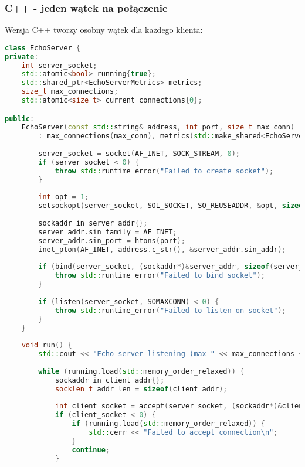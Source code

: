 \subsubsection{C++ - jeden wątek na połączenie}
Wersja C++ tworzy osobny wątek dla każdego klienta:
\begin{lstlisting}[language=C++, caption={Echo Serwer w C++ z jednym wątkiem na połączenie}, label={lst:cpp_echo_server}]
class EchoServer {
private:
    int server_socket;
    std::atomic<bool> running{true};
    std::shared_ptr<EchoServerMetrics> metrics;
    size_t max_connections;
    std::atomic<size_t> current_connections{0};

public:
    EchoServer(const std::string& address, int port, size_t max_conn) 
        : max_connections(max_conn), metrics(std::make_shared<EchoServerMetrics>()) {
        
        server_socket = socket(AF_INET, SOCK_STREAM, 0);
        if (server_socket < 0) {
            throw std::runtime_error("Failed to create socket");
        }
        
        int opt = 1;
        setsockopt(server_socket, SOL_SOCKET, SO_REUSEADDR, &opt, sizeof(opt));
        
        sockaddr_in server_addr{};
        server_addr.sin_family = AF_INET;
        server_addr.sin_port = htons(port);
        inet_pton(AF_INET, address.c_str(), &server_addr.sin_addr);
        
        if (bind(server_socket, (sockaddr*)&server_addr, sizeof(server_addr)) < 0) {
            throw std::runtime_error("Failed to bind socket");
        }
        
        if (listen(server_socket, SOMAXCONN) < 0) {
            throw std::runtime_error("Failed to listen on socket");
        }
    }
    
    void run() {
        std::cout << "Echo server listening (max " << max_connections << " connections)\n";
        
        while (running.load(std::memory_order_relaxed)) {
            sockaddr_in client_addr{};
            socklen_t addr_len = sizeof(client_addr);
            
            int client_socket = accept(server_socket, (sockaddr*)&client_addr, &addr_len);
            if (client_socket < 0) {
                if (running.load(std::memory_order_relaxed)) {
                    std::cerr << "Failed to accept connection\n";
                }
                continue;
            }
            

\end{lstlisting}
